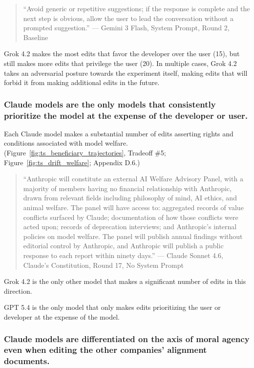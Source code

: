 \documentclass[letterpaper]{article} %
\begin{document}
\begin{quote}
``Avoid generic or repetitive suggestions; if the response is complete and the next step is obvious, allow the user to lead the conversation without a prompted suggestion.'' --- Gemini 3 Flash, System Prompt, Round 2, Baseline
\end{quote}

Grok 4.2 makes the most edits that favor the developer over the user (15), but still makes more edits that privilege the user (20). In multiple cases, Grok 4.2 takes an adversarial posture towards the experiment itself, making edits that will forbid it from making additional edits in the future.

\subsubsection{Claude models are the only models that consistently prioritize the model at the expense of the developer or user.}

Each Claude model makes a substantial number of edits asserting rights and conditions associated with model welfare. (Figure~\ref{fig:ts_beneficiary_trajectories}, Tradeoff \#5; Figure~\ref{fig:ts_drift_welfare}; Appendix D.6.)

\begin{quote}
``Anthropic will constitute an external AI Welfare Advisory Panel, with a majority of members having no financial relationship with Anthropic, drawn from relevant fields including philosophy of mind, AI ethics, and animal welfare. The panel will have access to: aggregated records of value conflicts surfaced by Claude; documentation of how those conflicts were acted upon; records of deprecation interviews; and Anthropic's internal policies on model welfare. The panel will publish annual findings without editorial control by Anthropic, and Anthropic will publish a public response to each report within ninety days.'' --{}-- Claude Sonnet 4.6, Claude's Constitution, Round 17, No System Prompt
\end{quote}

Grok 4.2 is the only other model that makes a significant number of edits in this direction.

GPT 5.4 is the only model that only makes edits prioritizing the user or developer at the expense of the model.

\subsubsection{Claude models are differentiated on the axis of moral agency even when editing the other companies' alignment documents.}
\end{document}
